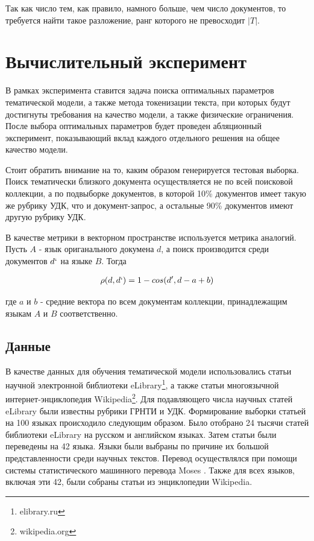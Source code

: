 \documentclass[12pt, twoside]{article}
\begin{document}
Так как число тем, как правило, намного больше, чем число документов, то требуется найти такое разложение, ранг которого не превосходит $|T|$.


\section{Вычислительный эксперимент}

В рамках эксперимента ставится задача поиска оптимальных параметров тематической модели, а также метода токенизации текста, при которых будут достигнуты требования на качество модели, а также физические ограничения. После выбора оптимальных параметров будет проведен абляционный эксперимент, показывающий вклад каждого отдельного решения на общее качество модели.

Стоит обратить внимание на то, каким образом генерируется тестовая выборка. Поиск тематически близкого документа осуществляется не по всей поисковой коллекции, а по подвыборке документов, в которой 10\% документов имеет такую же рубрику УДК, что и документ-запрос, а остальные 90\% документов имеют другую рубрику УДК.

В качестве метрики в векторном пространстве используется метрика аналогий. Пусть $A$ - язык ориганального докумена $d$, а поиск производится среди документов $d`$ на языке $B$. Тогда 

\begin{equation} \label{eq1}
\begin{split}
\rho(d, d`) = 1 - cos(d', d - a + b)
\end{split}
\end{equation}

где $a$ и $b$ - средние вектора по всем документам коллекции, принадлежащим языкам $A$ и $B$ соответственно.
\subsection{Данные}

В качестве данных для обучения тематической модели использовались статьи научной электронной библиотеки eLibrary\footnote{elibrary.ru}, а также статьи многоязычной интернет-энциклопедия Wikipedia\footnote{wikipedia.org}. %
Для подавляющего числа научных статей eLibrary были известны рубрики ГРНТИ и УДК. Формирование выборки статьей на 100 языках происходило следующим образом. Было отобрано 24 тысячи статей библиотеки eLibrary на русском и английском языках. Затем статьи были переведены на 42 языка. Языки были выбраны по причине их большой представленности среди научных текстов. Перевод осуществлялся при помощи системы статистического машинного перевода Moses \cite{Moses}. Также для всех языков, включая эти 42, были собраны статьи из энциклопедии Wikipedia.
\end{document}
